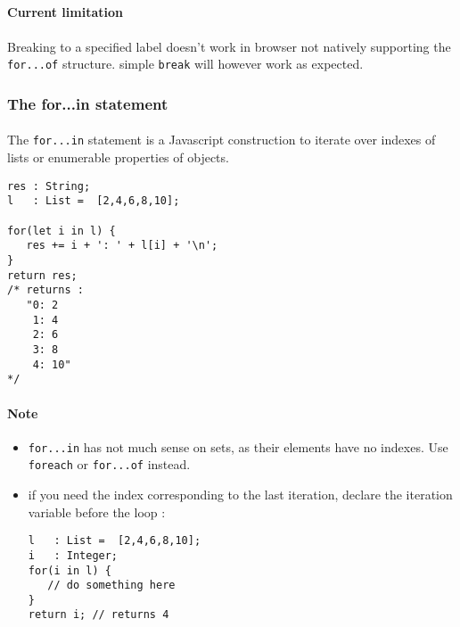 \documentclass{article}
\let\subsubsubsection\paragraph
\begin{document}
\begin{sloppypar}
         
         

\subsubsubsection{ Current limitation\\}
\paragraph{}
Breaking to a specified label doesn't work in browser not natively supporting the \lstinline!for...of! structure. simple \lstinline!break! will however work as expected.
         
      
      
      

\subsubsection{ The for...in statement}


\paragraph{}
The \lstinline!for...in! statement is a Javascript construction to iterate over indexes of lists or enumerable properties of objects.
{\begin{lstlisting}
res : String;
l   : List =  [2,4,6,8,10];

for(let i in l) {
   res += i + ': ' + l[i] + '\n';
}
return res;
/* returns :
   "0: 2
    1: 4
    2: 6
    3: 8
    4: 10"
*/
\end{lstlisting}
}

         

\subsubsubsection{ Note\\}
\begin{itemize}
	\item{ \lstinline!for...in! has not much sense on sets, as their elements have no indexes. Use \lstinline!foreach! or \lstinline!for...of! instead.}
	\item{                if you need the index corresponding to the last iteration, declare the iteration variable before the loop :
               
{\begin{lstlisting}
l   : List =  [2,4,6,8,10];
i   : Integer;
for(i in l) {
   // do something here
}
return i; // returns 4
\end{lstlisting}
}

            }
\end{itemize}

      


\end{sloppypar}
\end{document}
